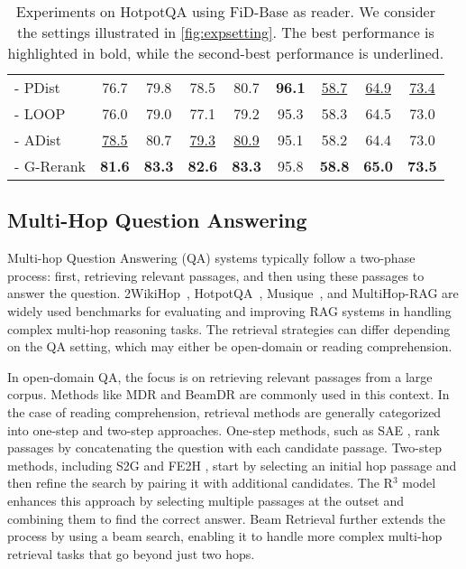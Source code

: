 \begin{table*}[!ht]
{\begin{tabular}{ l || c c|| c c | c || c c c }
    - PDist~\cite{DBLP:conf/naacl/GlassRCNCG22}         & 76.7  & 79.8  & 78.5 & 80.7 & \bf 96.1 & \underline{58.7} & \underline{64.9} & \underline{73.4} \\
    - LOOP~\cite{DBLP:journals/jmlr/IzacardLLHPSDJRG23}           & 76.0  & 79.0  & 77.1 & 79.2 & 95.3 & 58.3 & 64.5 & 73.0 \\
    - ADist~\cite{DBLP:conf/iclr/IzacardG21}& \underline{78.5}  & 80.7  & \underline{79.3} & \underline{80.9} & 95.1 & 58.2 & 64.4 & 73.0 \\
    \rowcolor{gray!10} - G-Rerank   & \bf 81.6  & \bf 83.3  & \bf 82.6 & \bf 83.3 & 95.8 & \bf 58.8 & \bf 65.0 & \bf 73.5 \\
    \bottomrule
\end{tabular}
}
\caption{Experiments on HotpotQA using FiD-Base as reader. We consider the settings illustrated in \autoref{fig:expsetting}. The best performance is highlighted in bold, while the second-best performance is underlined.}
\label{tbl:multi dataset experiment FiD-Base}
\end{table*}

\subsection{Multi-Hop Question Answering}\label{sec: Multi-Hop QA}
Multi-hop Question Answering (QA) systems typically follow a two-phase process: first, retrieving relevant passages, and then using these passages to answer the question. 2WikiHop~\cite{DBLP:conf/coling/HoNSA20}, HotpotQA~\cite{DBLP:conf/emnlp/Yang0ZBCSM18}, Musique~\cite{DBLP:journals/tacl/TrivediBKS22}, and MultiHop-RAG \cite{DBLP:journals/corr/abs-2401-15391} are widely used benchmarks for evaluating and improving RAG systems in handling complex multi-hop reasoning tasks. The retrieval strategies can differ depending on the QA setting, which may either be open-domain or reading comprehension. 

In open-domain QA, the focus is on retrieving relevant passages from a large corpus. Methods like MDR \cite{DBLP:conf/iclr/XiongLIDLWMY0KO21} and BeamDR \cite{DBLP:conf/naacl/ZhaoXBD21} are commonly used in this context. In the case of reading comprehension, retrieval methods are generally categorized into one-step and two-step approaches. One-step methods, such as SAE \cite{DBLP:conf/aaai/TuHW0HZ20}, rank passages by concatenating the question with each candidate passage. Two-step methods, including S2G \cite{DBLP:journals/corr/abs-2107-11823} and FE2H \cite{DBLP:conf/icassp/LiLY23}, start by selecting an initial hop passage and then refine the search by pairing it with additional candidates. The R$^3$ model \cite{DBLP:conf/cncl/YinWHWYZCHQ23} enhances this approach by selecting multiple passages at the outset and combining them to find the correct answer. Beam Retrieval \cite{DBLP:conf/naacl/ZhangZ00H24} further extends the process by using a beam search, enabling it to handle more complex multi-hop retrieval tasks that go beyond just two hops.

